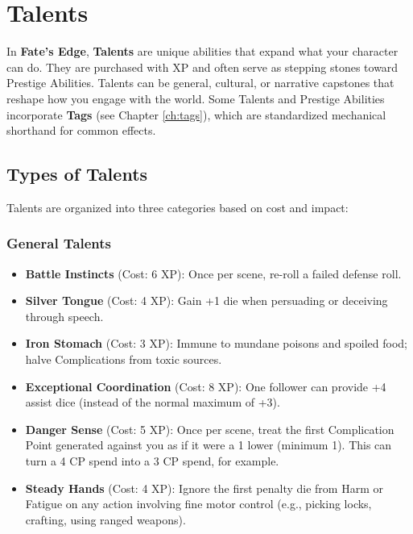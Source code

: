 
\chapter{Talents}
\label{ch:talents}

In \textbf{Fate's Edge}, \textbf{Talents}  are unique abilities that expand what your character can do. They are purchased with XP and often serve as stepping stones toward Prestige Abilities. Talents can be general, cultural, or narrative capstones that reshape how you engage with the world. Some Talents and Prestige Abilities incorporate \textbf{Tags} (see Chapter \ref{ch:tags}), which are standardized mechanical shorthand for common effects.

\section{Types of Talents}

Talents are organized into three categories based on cost and impact:

\subsection*{General Talents}

\begin{itemize}
    \item \textbf{Battle Instincts} (Cost: 6 XP): Once per scene, re-roll a failed defense roll.
    \item \textbf{Silver Tongue} (Cost: 4 XP): Gain +1 die when persuading or deceiving through speech.
    \item \textbf{Iron Stomach} (Cost: 3 XP): Immune to mundane poisons and spoiled food; halve Complications from toxic sources.
    \item \textbf{Exceptional Coordination} (Cost: 8 XP): One follower can provide +4 assist dice (instead of the normal maximum of +3).
    \item \textbf{Danger Sense} (Cost: 5 XP): Once per scene, treat the first Complication Point generated against you as if it were a 1 lower (minimum 1). This can turn a 4 CP spend into a 3 CP spend, for example.
    \item \textbf{Steady Hands} (Cost: 4 XP): Ignore the first penalty die from Harm or Fatigue on any action involving fine motor control (e.g., picking locks, crafting, using ranged weapons).
\end{itemize}

